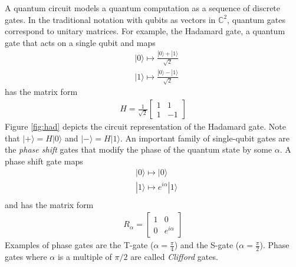 A quantum circuit models a quantum computation as a sequence of discrete gates.
In the traditional notation with qubits as vectors in $\mathbb{C}^2$, quantum gates correspond to unitary matrices.
For example, the Hadamard gate, a quantum gate that acts on a single qubit and maps
\begin{align*}
  & |0\rangle \mapsto \frac{|0\rangle + |1\rangle}{\sqrt{2}} \\
  & |1\rangle \mapsto \frac{|0\rangle - |1\rangle}{\sqrt{2}}
\end{align*}
has the matrix form
\begin{align*}
  H = \frac{1}{\sqrt{2}}\begin{bmatrix}1 & 1 \\ 1 & -1\end{bmatrix}
\end{align*}
Figure \ref{fig:had} depicts the circuit representation of the Hadamard gate.
Note that $|+\rangle = H|0\rangle$ and $|-\rangle = H|1\rangle$.
An important family of single-qubit gates are the \emph{phase shift} gates that modify the phase of the quantum state by some $\alpha$.
A phase shift gate maps
\begin{align*}
  & |0\rangle \mapsto |0\rangle \\
  & |1\rangle \mapsto e^{i\alpha}|1\rangle \\
\end{align*}
and has the matrix form
\begin{align*}
  R_{\alpha} = \begin{bmatrix}1 & 0 \\ 0 & e^{i\alpha}\end{bmatrix}
\end{align*}
Examples of phase gates are the T-gate ($\alpha = \frac{\pi}{4}$) and the S-gate ($\alpha = \frac{\pi}{2}$).
Phase gates where $\alpha$ is a multiple of $\pi / 2$ are called \emph{Clifford} gates.

